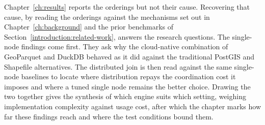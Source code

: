 Chapter~\ref{ch:results} reports the orderings but not their cause. Recovering that cause, by reading the orderings against the mechanisms set out in Chapter~\ref{ch:background} and the prior benchmarks of Section~\ref{introduction:related-work}, answers the research questions. The single-node findings come first. They ask why the cloud-native combination of GeoParquet and DuckDB behaved as it did against the traditional PostGIS and Shapefile alternatives. The distributed join is then read against the same single-node baselines to locate where distribution repays the coordination cost it imposes and where a tuned single node remains the better choice. Drawing the two together gives the synthesis of which engine suits which setting, weighing implementation complexity against usage cost, after which the chapter marks how far these findings reach and where the test conditions bound them.





